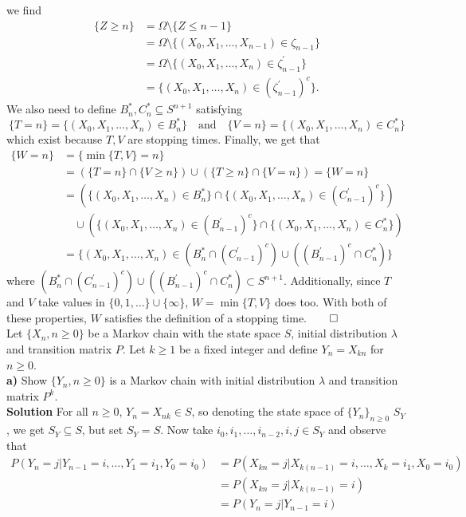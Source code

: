 \documentclass[11pt, letterpaper]{article}
\begin{document}
    we find
    \begin{align*}
        \{Z\geq n\}&=\Omega\setminus\{Z\leq n-1\}\\
        &=\Omega\setminus\{(X_0,X_1,\dots,X_{n-1})\in \zeta_{n-1}\}\\
        &=\Omega\setminus\{(X_0,X_1,\dots,X_n)\in\zeta_{n-1}^\prime\}\\
        &=\{(X_0,X_1,\dots,X_n)\in(\zeta_{n-1}^\prime)^c\}.
    \end{align*}
    We also need to define $B_n^\ast,C_n^\ast\subseteq S^{n+1}$ satisfying
    \[\{T=n\}=\{(X_0,X_1,\dots,X_n)\in B_n^\ast\}\quad\text{and}\quad\{V=n\}=\{(X_0,X_1,\dots,X_n)\in C_n^\ast\}\]
    which exist because $T,V$ are stopping times. Finally, we get that
    \begin{align*}
        \{W=n\}&=\{\min\{T,V\}=n\}\\
        &=(\{T=n\}\cap\{V\geq n\})\cup(\{T\geq n\}\cap\{V=n\})=\{W=n\}\\
        &=(\{(X_0,X_1,\dots,X_n)\in B_n^\ast\}\cap\{(X_0,X_1,\dots,X_n)\in(C_{n-1}^\prime)^c\})\\
        &\quad\cup(\{(X_0,X_1,\dots,X_n)\in (B_{n-1}^\prime)^c\}\cap\{(X_0,X_1,\dots,X_n)\in C_n^\ast\})\\
        &=\{(X_0,X_1,\dots,X_n)\in(B_n^\ast\cap(C_{n-1}^\prime)^c)\cup((B_{n-1}^\prime)^c\cap C_n^\ast)\}
    \end{align*}
    where $(B_n^\ast\cap(C_{n-1}^\prime)^c)\cup((B_{n-1}^\prime)^c\cap C_n^\ast)\subset S^{n+1}$. Additionally, since $T$ and $V$ take values in $\{0,1,\dots\}\cup\{\infty\}$, $W=\min\{T,V\}$ does too. With both of these properties, $W$ satisfies the definition of a stopping time.\hfill{$\qed$}\\[10pt]
     Let $\{X_n,n\geq 0\}$ be a Markov chain with the state space $S$, initial distribution $\lambda$ and transition matrix $P$. Let $k\geq 1$ be a fixed integer
    and define $Y_n=X_{kn}$ for $n\geq 0$.\\[10pt]
    {\bf a)} Show $\{Y_n,n\geq 0\}$ is a Markov chain with initial distribution $\lambda$ and transition matrix $P^k$.\\[10pt]
    {\bf Solution} For all $n\geq 0$, $Y_n=X_{nk}\in S$, so denoting the state space of $\{Y_n\}_{n\geq 0}$ $S_Y$, we get $S_Y\subseteq S$, but set $S_Y=S$.
    Now take $i_0,i_1,\dots,i_{n-2},i,j\in S_Y$ and observe that
    \begin{align*}
        P(Y_n=j|Y_{n-1}=i,\dots,Y_1=i_1,Y_0=i_0)&=P(X_{kn}=j|X_{k(n-1)}=i,\dots,X_{k}=i_1,X_0=i_0)\\
        &=P(X_{kn}=j|X_{k(n-1)}=i)\\
        &=P(Y_n=j|Y_{n-1}=i)
    \end{align*}
\end{document}
